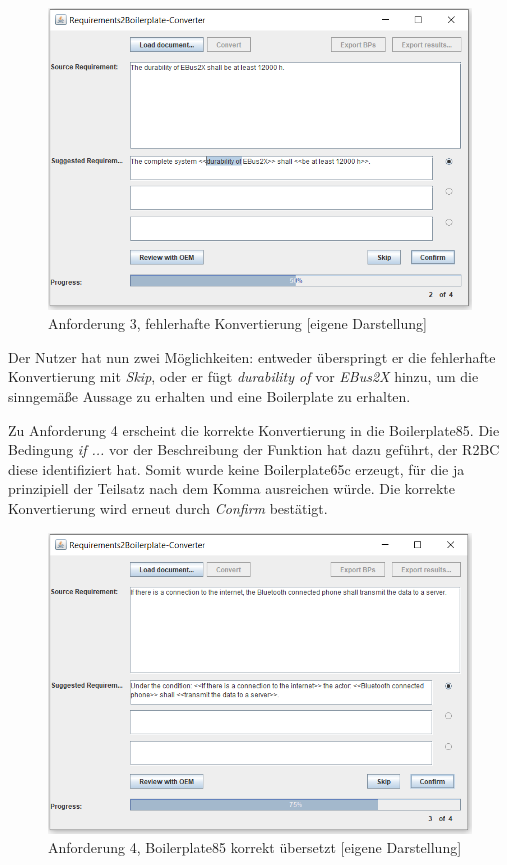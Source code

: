 \documentclass[12pt]{report}
\begin{document}
\begin{figure}[h!]
\begin{center}
\includegraphics[scale=0.7]{Bilder/GUI-req3.png}
\caption{Anforderung 3, fehlerhafte Konvertierung [eigene Darstellung]}
\end{center}
\end{figure}

Der Nutzer hat nun zwei Möglichkeiten: entweder überspringt er die fehlerhafte Konvertierung mit \textit{Skip}, oder er fügt \textit{durability of} vor \textit{EBus2X} hinzu, um die sinngemäße Aussage zu erhalten und eine Boilerplate zu erhalten.

Zu Anforderung 4 erscheint die korrekte Konvertierung in die Boilerplate85. Die Bedingung \textit{if ...} vor der Beschreibung der Funktion hat dazu geführt, der R2BC diese identifiziert hat. Somit wurde keine Boilerplate65c erzeugt, für die ja prinzipiell der Teilsatz nach dem Komma ausreichen würde.
Die korrekte Konvertierung wird erneut durch \textit{Confirm} bestätigt.

\begin{figure}[h!]
\begin{center}
\includegraphics[scale=0.7]{Bilder/GUI-req4.png}
\caption{Anforderung 4, Boilerplate85 korrekt übersetzt [eigene Darstellung]}
\end{center}
\end{figure}
\end{document}

